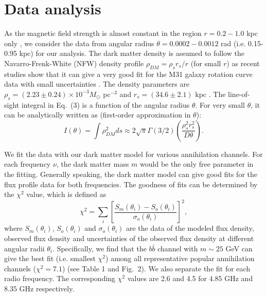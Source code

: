 \documentclass[useAMS,usenatbib]{mn2e}
\begin{document}
\section{Data analysis}
As the magnetic field strength is almost constant in the region $r=0.2-1.0$ kpc only \citep{Giebubel}, we consider the data from angular radius $\theta=0.0002-0.0012$ rad (i.e. 0.15-0.95 kpc) for our analysis. The dark matter density is assumed to follow the Navarro-Frenk-White (NFW) density profile $\rho_{DM}=\rho_sr_s/r$ (for small $r$) as recent studies show that it can give a very good fit for the M31 galaxy rotation curve data with small uncertainties \citep{Sofue}. The density parameters are $\rho_s=(2.23 \pm 0.24) \times 10^{-3}M_{\odot}$ pc$^{-3}$ and $r_s=(34.6 \pm 2.1)$ kpc \citep{Sofue}. The line-of-sight integral in Eq.~(3) is a function of the angular radius $\theta$. For very small $\theta$, it can be analytically written as (first-order approximation in $\theta$):
\begin{equation}
I(\theta)=\int \rho_{DM}^2ds \approx 2 \sqrt{\pi} \Gamma(3/2) \left(\frac{\rho_s^2r_s^2}{D \theta}\right).
\end{equation}

We fit the data with our dark matter model for various annihilation channels. For each frequency $\nu$, the dark matter mass $m$ would be the only free parameter in the fitting. Generally speaking, the dark matter model can give good fits for the flux profile data for both frequencies. The goodness of fits can be determined by the $\chi^2$ value, which is defined as
\begin{equation}
\chi^2=\sum_i \left[\frac{S_m(\theta_i)-S_o(\theta_i)}{\sigma_o(\theta_i)} \right]^2,
\end{equation}
where $S_m(\theta_i)$, $S_o(\theta_i)$ and $\sigma_o(\theta_i)$ are the data of the modeled flux density, observed flux density and uncertainties of the observed flux density at different angular radii $\theta_i$. Specifically, we find that the $b\bar{b}$ channel with $m \sim 25$ GeV can give the best fit (i.e. smallest $\chi^2$) among all representative popular annihilation channels ($\chi^2=7.1$) (see Table 1 and Fig.~2). We also separate the fit for each radio frequency. The corresponding $\chi^2$ values are 2.6 and 4.5 for 4.85 GHz and 8.35 GHz respectively. 
\end{document}
